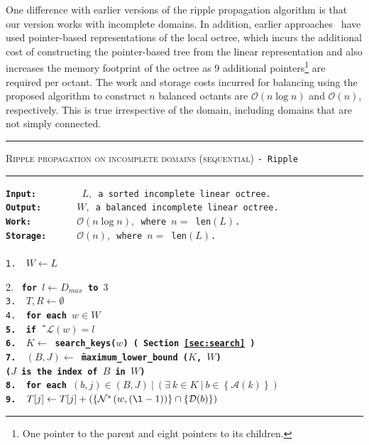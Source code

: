 One difference with earlier versions of the ripple propagation
algorithm is that our version works with incomplete domains. In
addition, earlier approaches\ \cite{bern99,tu04a,tu05} have used
pointer-based representations of the local octree, which incurs the
additional cost of constructing the pointer-based tree from the linear
representation and also increases the memory footprint of the octree
as $9$ additional pointers\footnote{One pointer to the parent and
eight pointers to its children.} are required per octant. The work and
storage costs incurred for balancing using the proposed algorithm to
construct $n$ balanced octants are $\mathcal{O}(n\log n)$ and
$\mathcal{O}(n)$, respectively. This is true irrespective of the
domain, including domains that are not simply connected.

\begin{table} 
\centering
\rule{\textwidth}{0.01mm}
\begin{algorithm}{ \textsc{Ripple propagation on incomplete domains (sequential)} \tt{- Ripple}}
\rule{\textwidth}{0.01mm}
\flushleft
\tt{\bf{Input:~~~~~~~~}} $L,$ a sorted incomplete linear octree.\\
  \tt{\bf{Output:~~~~~~}} $W,$ a balanced incomplete linear octree.\\
  \tt{\bf{Work:~~~~~~~~}} $\mathcal{O}(n\log n),$ where $n = $ len$(L)$.\\
  \tt{\bf{Storage:~~~~~}} $\mathcal{O}(n),$ where $n = $ len$(L)$.\\
~\\
1.~ \tt{$W \leftarrow L$}\\
\begin{tabbing}
2.~  \tt{\bf for} \= \tt{$l \leftarrow D_{max}$ \bf{to} $3$}\\
3.~ \>$T,R \leftarrow \emptyset$\\
4.~ \> {\bf for} \=\bf{each} \tt{$w \in W$}\\
5.~ \>\> {\bf if} \= $\mathcal{L}(w)=l$ \\
6.~ \>\>\> $K \leftarrow$ search\_keys($w$) ( Section \ref{sec:search} )\\
7.~ \>\>\> $(B,J) \leftarrow $ \=maximum\_lower\_bound ($K$, $W$) \\
    \>\>\>\> ($J$ is the index of $B$ in $W$)\\
8.~ \>\>\> {\bf for }\= \bf{each} $(b,j) \in (B,J) ~|~ \left(\exists~ k \in K ~|~ b \in \left\{\mathcal{A}(k)\right\}\right)$\\
9.~ \>\>\>\> $T[j] \leftarrow T[j] + \left( \left\{\mathcal{N}^s\left(w,\left(\l-1\right)\right)\right\} \cap \left\{\mathcal{D}(b)\right\} \right)$\\

\end{tabbing}
\end{algorithm}
\end{table}
